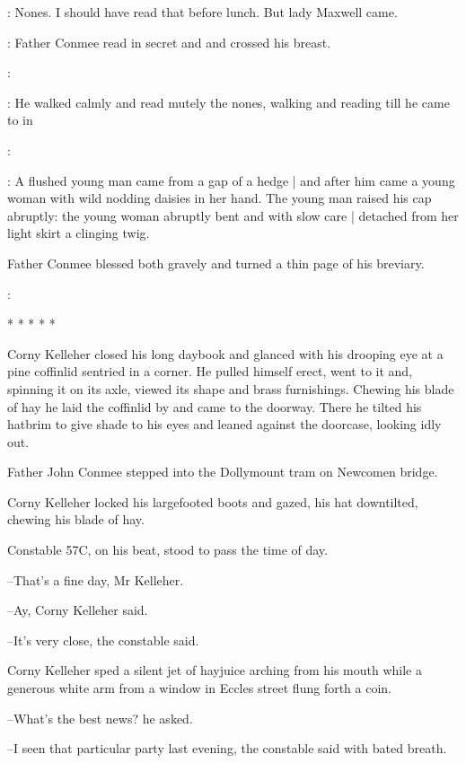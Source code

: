 \conmeeint:
Nones.
I should have read that before lunch.
But lady Maxwell came.

:
Father Conmee read in secret  and 
and crossed his breast.

\conmeeint:

:
He walked calmly and read mutely the nones,
walking and reading till
he came to
 in

\conmeeint:

:
A flushed young man came from a gap of a hedge |
and after him came a young woman
with wild nodding daisies in her hand.
The young man raised his cap abruptly:
the young woman abruptly bent
and with slow care |
detached from her light skirt a clinging twig.

Father Conmee blessed both gravely
and turned a thin page of his breviary.

\conmeeint:


    * * * * *


Corny Kelleher closed his long daybook and glanced with his
drooping eye at a pine coffinlid sentried in a corner. He pulled himself
erect, went to it and, spinning it on its axle, viewed its shape and brass
furnishings.
Chewing his blade of hay he laid the coffinlid by and came to
the doorway. There he tilted his hatbrim to give shade to his eyes and
leaned against the doorcase, looking idly out.

Father John Conmee stepped into the Dollymount tram on
Newcomen bridge.

Corny Kelleher locked his largefooted boots and gazed, his hat
downtilted, chewing his blade of hay.

Constable 57C, on his beat, stood to pass the time of day.

--That's a fine day, Mr Kelleher.

--Ay, Corny Kelleher said.

--It's very close,
the constable said.

Corny Kelleher sped a silent jet of hayjuice arching from his mouth
while a generous white arm from a window in Eccles street flung forth a
coin.

--What's the best news? he asked.

--I seen that particular party last evening, the constable said with bated
breath.


